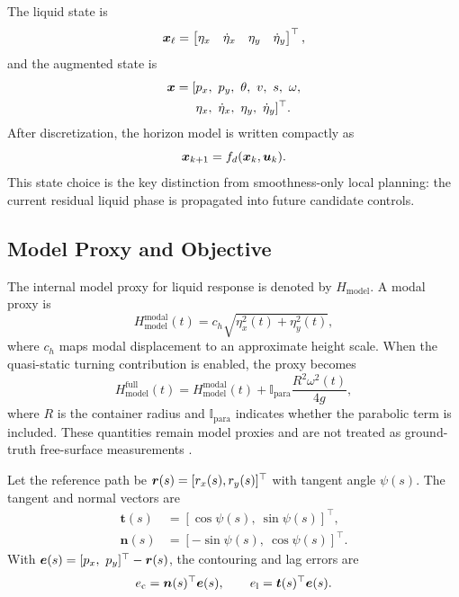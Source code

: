The liquid state is
\begin{equation}
  \bm{x}_{\ell} =
  \begin{bmatrix}
    \eta_x & \dot{\eta}_x & \eta_y & \dot{\eta}_y
  \end{bmatrix}^{\top},
\end{equation}
and the augmented state is
\begin{equation}
\begin{aligned}
  \bm{x} =
  [&p_x,\ p_y,\ \theta,\ v,\ s,\ \omega,\\
   &\eta_x,\ \dot{\eta}_x,\ \eta_y,\ \dot{\eta}_y]^\top .
\end{aligned}
\label{eq:method_augmented_state}
\end{equation}
After discretization, the horizon model is written compactly as
\begin{equation}
  \bm{x}_{k+1}=f_d(\bm{x}_k,\bm{u}_k).
  \label{eq:method_discrete_model}
\end{equation}
This state choice is the key distinction from smoothness-only local planning: the current residual liquid phase is propagated into future candidate controls.

\subsection{Model Proxy and Objective}

The internal model proxy for liquid response is denoted by $H_{\mathrm{model}}$.
A modal proxy is
\begin{equation}
  H_{\mathrm{model}}^{\mathrm{modal}}(t)
  =
  c_h\sqrt{\eta_x^2(t)+\eta_y^2(t)},
  \label{eq:method_h_modal}
\end{equation}
where $c_h$ maps modal displacement to an approximate height scale.
When the quasi-static turning contribution is enabled, the proxy becomes
\begin{equation}
  H_{\mathrm{model}}^{\mathrm{full}}(t)
  =
  H_{\mathrm{model}}^{\mathrm{modal}}(t)
  +\mathbb{I}_{\mathrm{para}}\frac{R^2\omega^2(t)}{4g},
  \label{eq:method_h_full}
\end{equation}
where $R$ is the container radius and $\mathbb{I}_{\mathrm{para}}$ indicates whether the parabolic term is included.
These quantities remain model proxies and are not treated as ground-truth free-surface measurements \cite{C01_Ferrari2026}.

Let the reference path be $\bm{r}(s)=[r_x(s),r_y(s)]^\top$ with tangent angle $\psi(s)$.
The tangent and normal vectors are
\begin{equation}
\begin{aligned}
  \bm{t}(s) &= [\cos\psi(s),\ \sin\psi(s)]^\top,\\
  \bm{n}(s) &= [-\sin\psi(s),\ \cos\psi(s)]^\top .
\end{aligned}
\end{equation}
With $\bm{e}(s)=[p_x,\ p_y]^\top-\bm{r}(s)$, the contouring and lag errors are
\begin{equation}
  e_{\mathrm{c}}=\bm{n}(s)^\top\bm{e}(s),\qquad
  e_{\mathrm{l}}=\bm{t}(s)^\top\bm{e}(s).
  \label{eq:method_contour_lag}
\end{equation}

